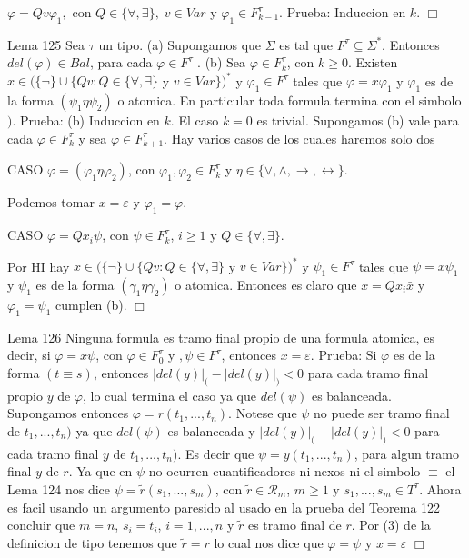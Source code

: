 \(\varphi =Qv\varphi _{1},\) con \(Q\in \{\forall ,\exists \},\;v\in Var\) y \( \varphi _{1}\in F_{k-1}^{\tau }.\)
Prueba: Induccion en \(k\). \(\Box\)

Lema 125 Sea \(\tau \) un tipo.
(a) Supongamos que \(\Sigma \) es tal que \(F^{\tau }\subseteq \Sigma ^{\ast }\). Entonces \(del(\varphi )\in Bal\), para cada \(\varphi \in F^{\tau }\) .
(b) Sea \(\varphi \in F_{k}^{\tau }\), con \(k\geq 0\). Existen \(x\in (\{\lnot \}\cup \{Qv:Q\in \{\forall ,\exists \}\) y \(v\in Var\})^{\ast }\) y \( \varphi _{1}\in F^{\tau }\) tales que \(\varphi =x\varphi _{1}\) y \(\varphi _{1} \) es de la forma \((\psi _{1}\eta \psi _{2})\) o atomica. En particular toda formula termina con el simbolo \()\).
Prueba: (b) Induccion en \(k\). El caso \(k=0\) es trivial. Supongamos (b) vale para cada \(\varphi \in F_{k}^{\tau }\) y sea \(\varphi \in F_{k+1}^{\tau }\). Hay varios casos de los cuales haremos solo dos

CASO \(\varphi =(\varphi _{1}\eta \varphi _{2})\), con \(\varphi _{1},\varphi _{2}\in F_{k}^{\tau }\) y \(\eta \in \{\vee ,\wedge ,\rightarrow ,\leftrightarrow \}\).

Podemos tomar \(x=\varepsilon \) y \(\varphi _{1}=\varphi \).

CASO \(\varphi =Qx_{i}\psi \), con \(\psi \in F_{k}^{\tau }\), \(i\geq 1\) y \(Q\in \{\forall ,\exists \}\).

Por HI hay \(\bar{x}\in (\{\lnot \}\cup \{Qv:Q\in \{\forall ,\exists \}\) y \(v\in Var\})^{\ast }\) y \(\psi _{1}\in F^{\tau }\) tales que \( \psi =x\psi _{1}\) y \(\psi _{1}\) es de la forma \((\gamma _{1}\eta \gamma _{2}) \) o atomica. Entonces es claro que \(x=Qx_{i}\bar{x}\) y \(\varphi _{1}=\psi _{1}\) cumplen (b). \(\Box\)

Lema 126 Ninguna formula es tramo final propio de una formula atomica, es decir, si \( \varphi =x\psi \), con \(\varphi \in F_{0}^{\tau }\) y \(,\psi \in F^{\tau }\), entonces \(x=\varepsilon \).
Prueba: Si \(\varphi \) es de la forma \((t\equiv s)\), entonces \(\left\vert del(y)\right\vert _{(}-\left\vert del(y)\right\vert _{)}< 0\) para cada tramo final propio \(y\) de \(\varphi \), lo cual termina el caso ya que \(del(\psi )\) es balanceada. Supongamos entonces \(\varphi =r(t_{1},...,t_{n})\). Notese que \(\psi \) no puede ser tramo final de \(t_{1},...,t_{n})\) ya que \(del(\psi )\) es balanceada y \(\left\vert del(y)\right\vert _{(}-\left\vert del(y)\right\vert _{)}< 0\) para cada tramo final \(y\) de \(t_{1},...,t_{n})\). Es decir que \(\psi =y(t_{1},...,t_{n})\), para algun tramo final \(y\) de \(r\). Ya que en \(\psi \) no ocurren cuantificadores ni nexos ni el simbolo \(\equiv \) el Lema 124 nos dice \(\psi =\tilde{r}(s_{1},...,s_{m})\), con \( \tilde{r}\in \mathcal{R}_{m}\), \(m\geq 1\) y \(s_{1},...,s_{m}\in T^{\tau }\). Ahora es facil usando un argumento paresido al usado en la prueba del Teorema 122 concluir que \(m=n\), \(s_{i}=t_{i}\), \( i=1,...,n\) y \(\tilde{r}\) es tramo final de \(r\). Por (3) de la definicion de tipo tenemos que \(\tilde{r}=r\) lo cual nos dice que \(\varphi =\psi \) y \( x=\varepsilon \) \(\Box\)

